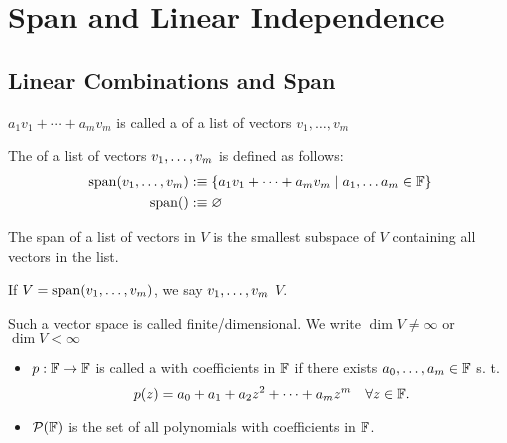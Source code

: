 \section{Span and Linear Independence}
\subsection{Linear Combinations and Span}

\setcounter{thm}{1}
\begin{mydef} 
  $a_1 v_1 + \cdots + a_m v_m$ is called a  of a list of vectors $v_1, \dots, v_m$
\end{mydef}

\setcounter{thm}{3}
\begin{mydef} 
	The  of a list of vectors $v_1, \dots, v_m$ is defined as follows:
  \begin{equation}
    \begin{aligned}
      \operatorname{span} (v_1, \dots, v_m) &:\equiv \{a_1 v_1 + \cdots + a_m v_m \mid a_1, \dots a_m \in \mathbb{F} \}\\
      \operatorname{span} ( ) &:\equiv \varnothing
    \end{aligned}
  \end{equation}
\end{mydef}

\setcounter{thm}{5}
\begin{thm} 
  The  span of a list of vectors in $V$ is the smallest subspace of $V$ containing all vectors in the list.
\end{thm}

\begin{mydef} 
  If $V=\operatorname{span} (v_1, \dots, v_m)$, we say $v_1, \dots, v_m$  $V$.
\end{mydef}

\setcounter{thm}{8}
\begin{mydef} 
  Such a vector space is called finite\-/dimensional. We write $\dim V \neq \infty$ or $\dim V < \infty$
\end{mydef}


\begin{mydef}
  \phantom{.}
  \begin{itemize}
    \item $p: \mathbb{F} \to \mathbb{F}$ is called a  with coefficients in $\mathbb{F}$ if there exists $a_0, \ldots, a_m \in \mathbb{F}$ s. t.
    \begin{equation}
      p(z)=a_0 + a_1 + a_2z^2 + \cdots + a_m z^m \quad \forall z \in \mathbb{F}.
    \end{equation}
    \item $\mathcal{P} (\mathbb{F})$ is the set of all polynomials with coefficients in $\mathbb{F}$.
  \end{itemize}
\end{mydef}

